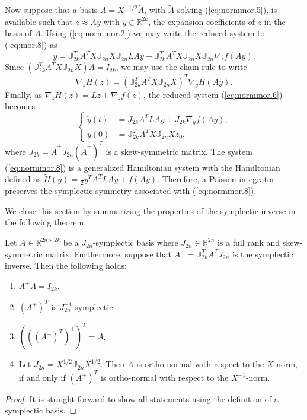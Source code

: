Now suppose that a basis $A=X^{-1/2}\tilde A$, with $\tilde A$ solving (\ref{eq:normmor.5}), is available such that $z \approx Ay$ with $y\in \mathbb R^{2k}$, the expansion coefficients of $z$ in the basis of $A$. Using (\ref{eq:normmor.2}) we may write the reduced system to (\ref{eq:mor.8}) as
\begin{equation} \label{eq:normmor.6}
	\dot y = \mathbb J_{2k}^T A^T X \mathbb J_{2n} X \mathbb{J}_{2n} LAy + \mathbb J_{2k}^T A^T X \mathbb J_{2n} X \mathbb{J}_{2n} \nabla_z f(Ay).
\end{equation}
Since $(\mathbb J_{2k}^T A^T X \mathbb J_{2n} X) A = I_{2k}$, we may use the chain rule to write
\begin{equation} \label{eq:normmor.7}
	\nabla_z H(z) = ( \mathbb J_{2k}^T A^T X \mathbb J_{2n} X )^T \nabla_y H(Ay).
\end{equation}
Finally, as $\nabla_z H(z) = Lz + \nabla_z f(z)$, the reduced system (\ref{eq:normmor.6}) becomes
\begin{equation} \label{eq:normmor.8}
\left\{
\begin{aligned}
	\dot y(t) &= J_{2k} A^T L A y + J_{2k} \nabla_y f(Ay), \\
	y(0) &= \mathbb J_{2k}^T A^T X \mathbb J_{2n} X z_0,
\end{aligned}
\right.
\end{equation}
where $J_{2k}=\tilde A^+ J_{2n} (\tilde A^+)^T$ is a skew-symmetric matrix. The system (\ref{eq:normmor.8}) is a generalized Hamiltonian system with the Hamiltonian defined as $\tilde H(y) = \frac 1 2 y^TA^TLAy + f(Ay)$. Therefore, a Poisson integrator preserves the symplectic symmetry associated with (\ref{eq:normmor.8}). 

We close this section by summarizing the properties of the symplectic inverse in the following theorem.
\begin{theorem} \label{thm:2}
Let $A\in \mathbb R^{2n\times 2k}$ be a $J_{2n}$-symplectic basis where $J_{2n}\in\mathbb R^{2n}$ is a full rank and skew-symmetric matrix. Furthermore, suppose that $A^{+} = \mathbb{J}_{2k}^T A^T J_{2n}$ is the symplectic inverse. Then the following holds:
\begin{enumerate}
\item $A^+A = I_{2k}$.
\item $(A^+)^T$ is $J_{2n}^{-1}$-symplectic.
\item $\left(\left(\left(A^+\right)^T\right)^+\right)^T = A$.
\item Let $J_{2n}=X^{1/2}\mathbb J_{2n} X^{1/2}$. Then $A$ is ortho-normal with respect to the $X$-norm, if and only if $(A^+)^T$ is ortho-normal with respect to the $X^{-1}$-norm.
\end{enumerate}
\end{theorem}
\begin{proof}
It is straight forward to show all statements using the definition of a symplectic basis.
\end{proof}

